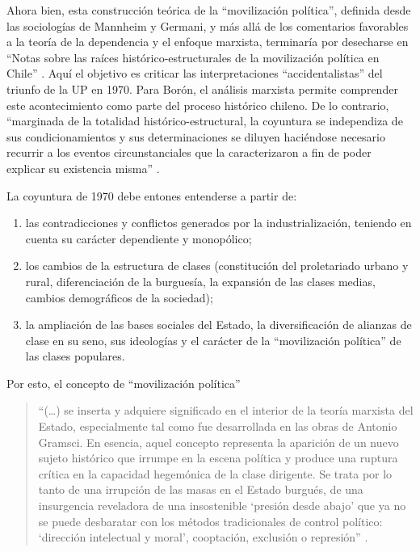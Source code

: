 {Ahora bien, esta construcción teórica de la \enquote{movilización política}, definida desde las sociologías de Mannheim y Germani, y más allá de los comentarios favorables a la teoría de la dependencia y el enfoque marxista, terminaría por desecharse en \enquote{Notas sobre las raíces histórico-estructurales de la movilización política en Chile} \parencite{1574-BORON1975}. Aquí el objetivo es criticar las interpretaciones \enquote{accidentalistas} del triunfo de la UP en 1970. Para Borón, el análisis marxista permite comprender este acontecimiento como parte del proceso histórico chileno. De lo contrario, \enquote{marginada de la totalidad histórico-estructural, la coyuntura se independiza de sus condicionamientos y sus determinaciones se diluyen haciéndose necesario recurrir a los eventos circunstanciales que la caracterizaron a fin de poder explicar su existencia misma} \parencite[68]{1574-BORON1975}.

La coyuntura de 1970 debe entones entenderse a partir de:

\begin{enumerate}
\item las contradicciones y conflictos generados por la industrialización, teniendo en cuenta su carácter dependiente y monopólico;
\item los cambios de la estructura de clases (constitución del proletariado urbano y rural, diferenciación de la burguesía, la expansión de las clases medias, cambios demográficos de la sociedad);
\item la ampliación de las bases sociales del Estado, la diversificación de alianzas de clase en su seno, sus ideologías y el carácter de la \enquote{movilización política} de las clases populares.
\end{enumerate}

Por esto, el concepto de \enquote{movilización política}

\begin{quote}
\enquote{(\dots) se inserta y adquiere significado en el interior de la teoría marxista del Estado, especialmente tal como fue desarrollada en las obras de Antonio Gramsci. En esencia, aquel concepto representa la aparición de un nuevo sujeto histórico que irrumpe en la escena política y produce una ruptura crítica en la capacidad hegemónica de la clase dirigente. Se trata por lo tanto de una irrupción de las masas en el Estado burgués, de una insurgencia reveladora de una insostenible \enquote{presión desde abajo} que ya no se puede desbaratar con los métodos tradicionales de control político: \enquote{dirección intelectual y moral}, cooptación, exclusión o represión} \parencite[71-72]{1574-BORON1975}.
\end{quote}

}
